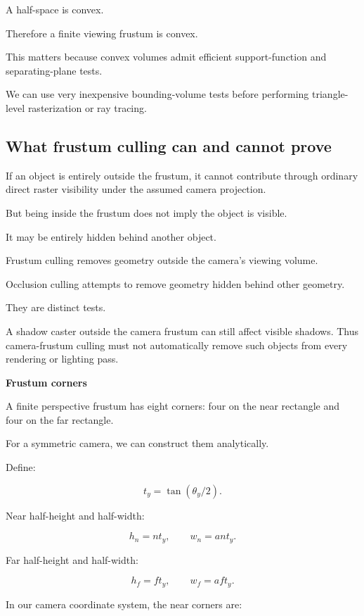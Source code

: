 A half-space is convex.

Therefore a finite viewing frustum is convex.

This matters because convex volumes admit efficient support-function and separating-plane tests.

We can use very inexpensive bounding-volume tests before performing triangle-level rasterization or ray tracing.

\subsection{What frustum culling can and cannot prove}\label{02-foundations-ii-ch034-what-frustum-culling-can-and-cannot-prove}

\hypertarget{02-foundations-ii-ch034-what-frustum-culling-can-and-cannot-prove}{}

If an object is entirely outside the frustum, it cannot contribute through ordinary direct raster visibility under the assumed camera projection.

But being inside the frustum does not imply the object is visible.

It may be entirely hidden behind another object.

Frustum culling removes geometry outside the camera's viewing volume.

Occlusion culling attempts to remove geometry hidden behind other geometry.

They are distinct tests.

A shadow caster outside the camera frustum can still affect visible shadows. Thus camera-frustum culling must not automatically remove such objects from every rendering or lighting pass.

\textbf{Frustum corners}

A finite perspective frustum has eight corners: four on the near rectangle and four on the far rectangle.

For a symmetric camera, we can construct them analytically.

Define:

\[
 t_y=\tan(\theta_y/2).
\]

Near half-height and half-width:

\[
 \boxed{ h_n=nt_y,\qquad w_n=ant_y }.
\]

Far half-height and half-width:

\[
 \boxed{ h_f=ft_y,\qquad w_f=aft_y }.
\]

In our camera coordinate system, the near corners are:

